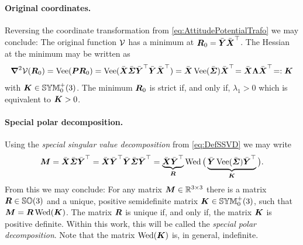 \paragraph{Original coordinates.}
Reversing the coordinate transformation from \eqref{eq:AttitudePotentialTrafo} we may conclude:
The original function $\mathcal{V}$ has a minimum at $\boldsymbol{R}_0 = \bar{\boldsymbol{Y}} \bar{\boldsymbol{X}}^\top$.
The Hessian at the minimum may be written as
\begin{align}
 \boldsymbol{\nabla}^2 \mathcal{V} (\boldsymbol{R}_0) 
 = \operatorname{Vee}(\boldsymbol{P}\boldsymbol{R}_0) 
 = \operatorname{Vee}(\bar{\boldsymbol{X}} \bar{\boldsymbol{\varSigma}} \bar{\boldsymbol{Y}}^\top \bar{\boldsymbol{Y}} \bar{\boldsymbol{X}}^\top)
 = \bar{\boldsymbol{X}} \operatorname{Vee}(\bar{\boldsymbol{\varSigma}}) \bar{\boldsymbol{X}}^\top\!
 = \bar{\boldsymbol{X}} \boldsymbol{\Lambda} \bar{\boldsymbol{X}}^\top\!
 =: \boldsymbol{K}
\end{align}
with $\boldsymbol{K} \in \mathbb{SYM}^{+}_{0}(3)$.
The minimum $\boldsymbol{R}_0$ is strict if, and only if, $\lambda_1 > 0$ which is equivalent to $\boldsymbol{K} > 0$.

\paragraph{Special polar decomposition.}
Using the \textit{special singular value decomposition} from \eqref{eq:DefSSVD} we may write
\begin{align}
 \boldsymbol{M} = \bar{\boldsymbol{X}} \bar{\boldsymbol{\varSigma}} \bar{\boldsymbol{Y}}^\top
 = \bar{\boldsymbol{X}} \bar{\boldsymbol{Y}}^\top \bar{\boldsymbol{Y}} \bar{\boldsymbol{\varSigma}} \bar{\boldsymbol{Y}}^\top
 = \underbrace{\bar{\boldsymbol{X}} \bar{\boldsymbol{Y}}^\top}_{\boldsymbol{R}} \operatorname{Wed}\big(\underbrace{\bar{\boldsymbol{Y}} \operatorname{Vee}(\bar{\boldsymbol{\varSigma}}) \bar{\boldsymbol{Y}}^\top}_{\boldsymbol{K}}\big).
\end{align}
From this we may conclude:
For any matrix $\boldsymbol{M} \in\mathbb{R}^{3\times3}$ there is a matrix $\boldsymbol{R} \in \mathbb{SO}(3)$ and a unique, positive semidefinite matrix $\boldsymbol{K} \in \mathbb{SYM}^{+}_{0}(3)$, such that $\boldsymbol{M} = \boldsymbol{R} \operatorname{Wed}(\boldsymbol{K})$.
The matrix $\boldsymbol{R}$ is unique if, and only if, the matrix $\boldsymbol{K}$ is positive definite.
Within this work, this will be called the \textit{special polar decomposition}.
Note that the matrix $\operatorname{Wed}(\boldsymbol{K})$ is, in general, indefinite.


